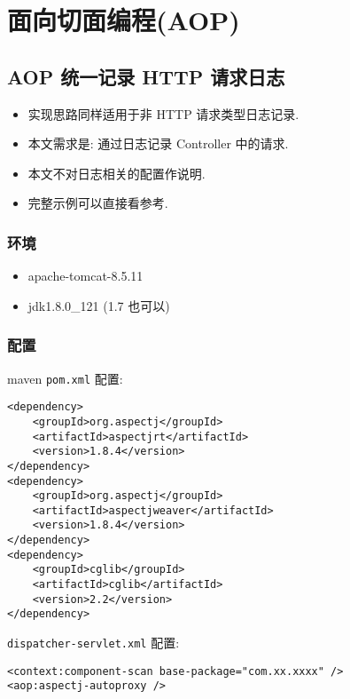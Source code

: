 \section{面向切面编程(AOP)}\label{ux9762ux5411ux5207ux9762ux7f16ux7a0baop}

\subsection{AOP 统一记录 HTTP
请求日志}\label{aop-ux7edfux4e00ux8bb0ux5f55-http-ux8bf7ux6c42ux65e5ux5fd7}

\begin{itemize}
\tightlist
\item
  实现思路同样适用于非 HTTP 请求类型日志记录.
\item
  本文需求是: 通过日志记录 Controller 中的请求.
\item
  本文不对日志相关的配置作说明.
\item
  完整示例可以直接看参考.
\end{itemize}

\subsubsection{环境}\label{ux73afux5883}

\begin{itemize}
\tightlist
\item
  apache-tomcat-8.5.11
\item
  jdk1.8.0\_121 (1.7 也可以)
\end{itemize}

\subsubsection{配置}\label{ux914dux7f6e}

maven \lstinline!pom.xml! 配置:

\begin{lstlisting}
<dependency>
    <groupId>org.aspectj</groupId>
    <artifactId>aspectjrt</artifactId>
    <version>1.8.4</version>
</dependency>
<dependency>
    <groupId>org.aspectj</groupId>
    <artifactId>aspectjweaver</artifactId>
    <version>1.8.4</version>
</dependency>
<dependency>
    <groupId>cglib</groupId>
    <artifactId>cglib</artifactId>
    <version>2.2</version>
</dependency>
\end{lstlisting}

\lstinline!dispatcher-servlet.xml! 配置:

\begin{lstlisting}
<context:component-scan base-package="com.xx.xxxx" />
<aop:aspectj-autoproxy />
\end{lstlisting}

